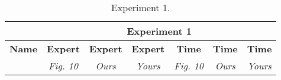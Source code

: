 \begin{table}

\experimentTableSize

\begin{tabular}{l|cccccc}
& \multicolumn{6}{c}{\textbf{Experiment 1}} \\\hline
\textbf{Name} &
\textbf{Expert} & \textbf{Expert} & \textbf{Expert} &
\textbf{Time} & \textbf{Time} & \textbf{Time} \\
&
\textit{Fig. 10} & \textit{Ours} & \textit{Yours} &
\textit{Fig. 10} & \textit{Ours} & \textit{Yours} \\

\end{tabular}

\vspace{0.10in}

\caption{Experiment 1.}

\end{table}

